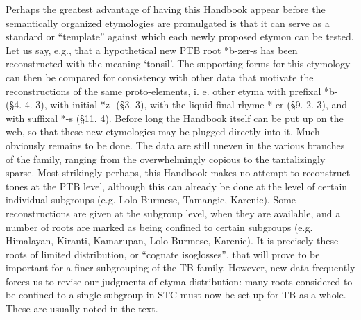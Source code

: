 Perhaps the greatest advantage of having this Handbook appear before the semantically organized etymologies are promulgated is that it can serve as a standard or ``template'' against which each newly proposed etymon can be tested. Let us say, e.g., that a hypothetical new PTB root *b-zer-s has been reconstructed with the meaning `tonsil'. The supporting forms for this etymology can then be compared for consistency with other data that motivate the reconstructions of the same proto-elements, i.
e. other etyma with prefixal *b- (\S 4.
4.
3), with initial *z- (\S 3.
3), with the liquid-final rhyme *-er (\S 9.
2.
3), and with suffixal *-s (\S 11.
4). Before long the Handbook itself can be put up on the web, so that these new etymologies may be plugged directly into it.
Much obviously remains to be done. The data are still uneven in the various branches of the family, ranging from the overwhelmingly copious to the tantalizingly sparse. Most strikingly perhaps, this Handbook makes no attempt to reconstruct tones at the PTB level, although this can already be done at the level of certain individual subgroups (e.g. Lolo-Burmese, Tamangic, Karenic).
Some reconstructions are given at the subgroup level, when they are available, and a number of roots are marked as being confined to certain subgroups (e.g. Himalayan, Kiranti, Kamarupan, Lolo-Burmese, Karenic). It is precisely these roots of limited distribution, or ``cognate isoglosses'', that will prove to be important for a finer subgrouping of the TB family. However, new data frequently forces us to revise our judgments of etyma distribution: many roots considered to be confined to a single subgroup in STC must now be set up for TB as a whole. These are usually noted in the text.
